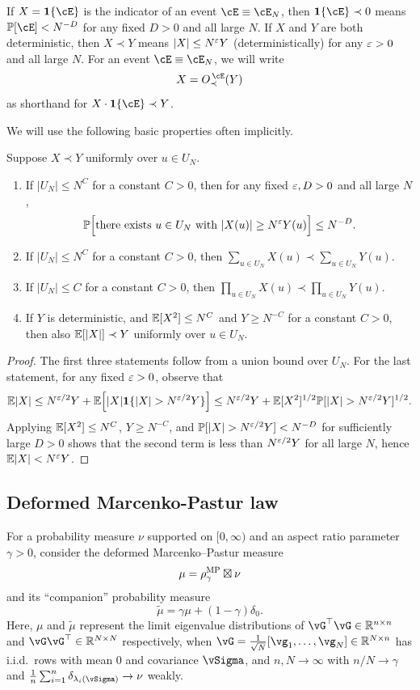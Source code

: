 If $X=\bI\{\cE\}$ is the indicator of an event $\cE \equiv \cE_N$, then
$\bI\{\cE\} \prec 0$ means $\P[\cE]<N^{-D}$ for any fixed $D>0$ and all large
$N$. If $X$ and $Y$ are both deterministic, then $X \prec Y$ means
$|X| \leq N^\varepsilon Y$ (deterministically) for any $\varepsilon>0$ and all large $N$.
For an event $\cE \equiv \cE_N$, we will write
\[X=\SDcE{Y}\]
as shorthand for $X \cdot \bI\{\cE\} \prec Y$.

We will use the following basic properties often implicitly.

\begin{proposition}\label{prop:domination}
Suppose $X \prec Y$ uniformly over $u \in U_N$.
\begin{enumerate}[label=(\alph*)]
\item If $|U_N|\leq N^C$ for a constant $C>0$, then
for any fixed $\varepsilon,D>0$ and all large $N$,
\[\mathbb{P} \Big[\text{there exists } u\in U_N \text{ with } |X(u)|
\geq N^\varepsilon Y(u)\Big] \leq N^{-D}.\]
\item If $|U_N| \leq N^C$ for a constant $C>0$, then
$\sum_{u \in U_N} X(u) \prec \sum_{u \in U_N} Y(u)$.
\item If $|U_N| \leq C$ for a constant $C>0$, then
$\prod_{u \in U_N} X(u) \prec \prod_{u \in U_N} Y(u)$.
\item If $Y$ is deterministic, and $\mathbb{E}[X^2] \leq N^C$ and $Y \geq N^{-C}$
for a constant $C>0$, then also $\mathbb{E}[|X|] \prec Y$ uniformly over $u \in U_N$.
\end{enumerate}
\end{proposition}
\begin{proof}
The first three statements follow from a union bound over $U_N$. For the last
statement, for any fixed $\varepsilon>0$, observe that
\[\E|X| \leq N^{\eps/2}Y+\E\Big[|X|\bI\{|X|>N^{\eps/2}Y\}\Big]
\leq N^{\eps/2}Y+\E[X^2]^{1/2}\P[|X|>N^{\eps/2}Y]^{1/2}.\]
Applying $\mathbb{E}[X^2] \leq N^C$, $Y \geq N^{-C}$, and
$\P[|X|>N^{\eps/2}Y]<N^{-D}$ for sufficiently large $D>0$ shows that the
second term is less than $N^{\varepsilon/2}Y$ for all large $N$, hence $\mathbb{E}|X|<N^\varepsilon
Y$.
\end{proof}

\subsection{Deformed Marcenko-Pastur law}

For a probability measure $\nu$ supported on $[0,\infty)$ and an aspect ratio
parameter $\gamma>0$, consider the deformed Marcenko–Pastur measure
\[\mu=\rho^{\textnormal{MP}}_{\gamma}\boxtimes \nu\]
and its ``companion'' probability measure
\[\tilde \mu=\gamma\mu+(1-\gamma)\delta_0.\]
Here, $\mu$ and $\tilde\mu$ represent the limit eigenvalue distributions of
$\vG^\top \vG \in \R^{n \times n}$ and
$\vG\vG^\top \in \R^{N \times N}$ respectively, when
$\vG=\frac{1}{\sqrt{N}}[\vg_1,\ldots,\vg_N] \in \R^{N
\times n}$ has i.i.d.\ rows with mean 0 and covariance $\vSigma$, and
$n,N \to \infty$ with $n/N \to \gamma$ and 
$\frac{1}{n}\sum_{i=1}^n \delta_{\lambda_i(\vSigma)} \to \nu$ weakly.

